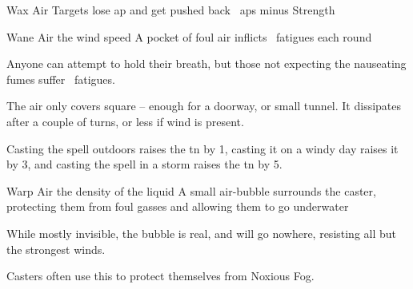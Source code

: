   {}%
  {Wax}%
  {Air}%
  {}%
  {Targets lose  \gls{ap} and get pushed back ~\glspl{ap} minus Strength}%
  {}

  {}%
  {Wane}%
  {Air}%
  {the wind speed}%
  {A pocket of foul air inflicts ~\glspl{fatigue} each round}%
  {
    Anyone can attempt to hold their breath, but those not expecting the nauseating fumes suffer ~\glspl{fatigue}.

    The air only covers  square -- enough for a doorway, or small tunnel.
    It dissipates after a couple of turns, or less if wind is present.

    Casting the spell outdoors raises the \gls{tn} by 1, casting it on a windy day raises it by 3, and casting the spell in a storm raises the \gls{tn} by 5.
  }

  {}%
  {Warp}%
  {Air}%
  {the density of the liquid}%
  {A small air-bubble surrounds the caster, protecting them from foul gasses and allowing them to go underwater}%
  {
    While mostly invisible, the bubble is real, and will go nowhere, resisting all but the strongest winds.

    Casters often use this to protect themselves from Noxious Fog.
  }

